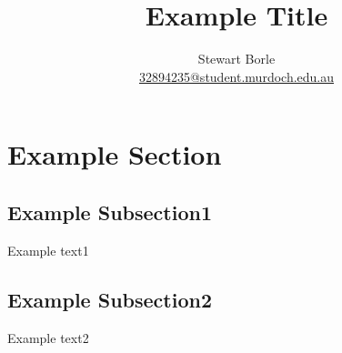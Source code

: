\documentclass{article}
\author{Stewart Borle \\ \href{mailto:32894235@student.murdoch.edu.au}{32894235@student.murdoch.edu.au}}
\begin{document}
\title{Example Title}
\maketitle

\tableofcontents

\section{Example Section}

\subsection{Example Subsection1}
Example text1

\subsection{Example Subsection2}
Example text2
\end{document}
